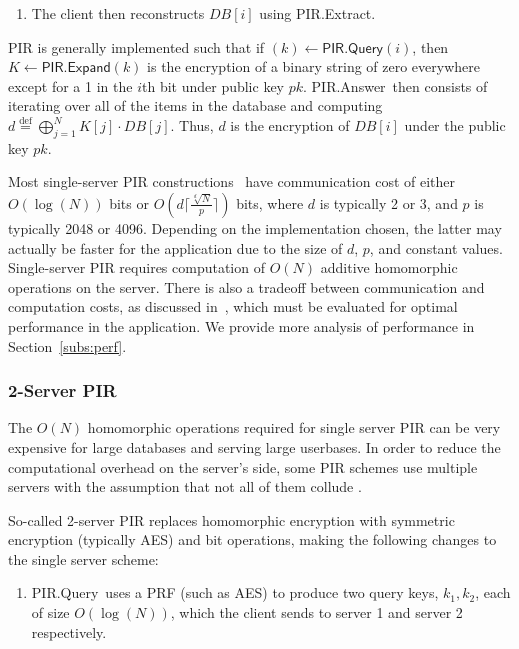 \documentclass[11pt]{article} %
\newcommand{\sectionref}[1]{Section~\ref{#1}}
\newcommand{\pirqe}{\textsf{PIR.Query}}
\newcommand{\pirexpand}{\textsf{PIR.Expand}}
\newcommand{\pirans}{\textsf{PIR.Answer}}
\newcommand{\pirextract}{\textsf{PIR.Extract}}
\newcommand{\ceil}[1]{{\lceil{#1}\rceil}}
\begin{document}
{\begin{enumerate}
		\item The client then reconstructs $DB[i]$ using \pirextract.
		
	\end{enumerate}
	
	PIR is generally implemented such that if $(k) \gets \pirqe(i)$, then $K \gets \pirexpand(k)$ is the encryption of a binary string of zero everywhere except for a 1 in the $i$th bit under public key $pk$. \pirans\ then consists of iterating over all of the items in the database and computing $d \overset{\textrm{def}}= \textstyle  \bigoplus_{j=1}^N K[j] \cdot DB[j]$. Thus, $d$ is the encryption of $DB[i]$ under the public key $pk$.
	
	Most single-server PIR constructions~\cite{10.1007,10.1007/978-3-319-11203-9_22,SP:ACLS18,  EPRINT:ALPRSSY19} have communication cost of either $O(\log(N))$ bits or $O(d \ceil{\frac{\sqrt[d]{N}}{p}})$ bits, where $d$ is typically 2 or 3, and  $p$ is typically 2048 or 4096. Depending on the implementation chosen, the latter may actually be faster for the application due to the size of $d$, $p$, and constant values. Single-server PIR requires computation of $O(N)$ additive homomorphic operations on the server. There is also a tradeoff between communication and computation costs, as discussed in~\cite{EPRINT:ALPRSSY19}, which must be evaluated for optimal performance in the application.  We provide more analysis of performance in \sectionref{subs:perf}.
	
	
	\subsubsection{2-Server PIR}
	The $O(N)$ homomorphic operations required for single server PIR can be very expensive for large databases and serving large userbases. In order to reduce the computational overhead on the server's side, some PIR schemes use multiple servers with the assumption that not all of them collude \cite{EC:BoyGilIsh15,CCS:BoyGilIsh16}.
	
	So-called 2-server PIR replaces homomorphic encryption with symmetric encryption (typically AES) and bit operations, making the following changes to the single server scheme:
	
	\begin{enumerate}
		\item \pirqe\ uses a PRF (such as AES) to produce two query keys, $k_1, k_2$, each of size $O(\log(N))$, which the client sends to server 1 and server 2 respectively.
		

\end{enumerate}}
\end{document}

